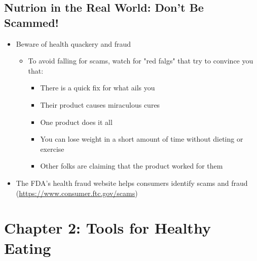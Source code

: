 \documentclass[12pt]{article}
\begin{document}
        \subsection{Nutrion in the Real World: Don't Be Scammed!}
            \begin{itemize}
                \item Beware of health quackery and fraud
                    \begin{itemize}
                        \item To avoid falling for scams, watch for "red falgs" that try to convince you that:
                            \begin{itemize}
                                \item There is a quick fix for what ails you
                                \item Their product causes miraculous cures
                                \item One product does it all
                                \item You can lose weight in a short amount of time without dieting or exercise
                                \item Other folks are claiming that the product worked for them
                            \end{itemize}
                    \end{itemize}
                \item The FDA's health fraud website helps consumers identify scams and fraud (\href{https://www.consumer.ftc.gov/scams}{https://www.consumer.ftc.gov/scams})
            \end{itemize}

    \section{Chapter 2: Tools for Healthy Eating}
\end{document}
